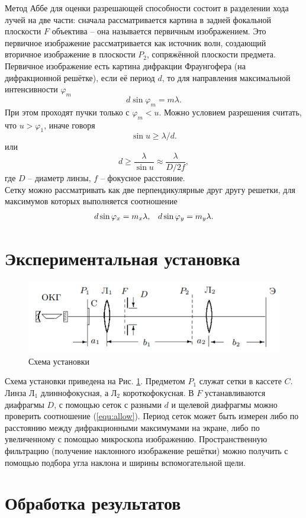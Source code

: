 \documentclass{article}
\begin{document}
Метод Аббе для оценки разрешающей способности состоит в разделении хода лучей на две части: сначала рассматривается картина в задней фокальной плоскости $F$ объектива -- она называется первичным изображением. Это первичное изображение рассматривается как источник волн, создающий вторичное изображение в плоскости $P_2$, сопряжённой плоскости предмета.\\
Первичное изображение есть картина дифракции Фраунгофера (на дифракционной решётке), если её период $d$, то для направления максимальной интенсивности $\varphi_m$
\begin{equation}
d \sin \varphi_m = m\lambda.
\end{equation}
При этом проходят пучки только с $\varphi_m < u$. Можно условием разрешения считать, что $u > \varphi_1$, иначе говоря
$$
\sin u \geq \lambda/d.
$$
или
\begin{equation}
\label{equ:allow}
d \geq \dfrac{\lambda}{\sin u} \approx \dfrac{\lambda}{D/2f},
\end{equation}
где $D$ -- диаметр линзы, $f$ -- фокусное расстояние.\\
Сетку можно рассматривать как две перпендикулярные друг другу решетки, для максимумов которых выполняется соотношение
\begin{equation}
\begin{array}{c c}
d\sin \varphi_x = m_x \lambda, & d\sin \varphi_y = m_y \lambda. \\
\end{array}
\end{equation}

\section{Экспериментальная установка}
\begin{figure}[h]
	\centering
	\includegraphics[scale=0.7]{stand.png}
	\caption{Схема установки}
	\label{fig:stand}
\end{figure}
Схема установки приведена на Рис. \ref{fig:stand}. Предметом $P_1$ служат сетки в кассете $C$. Линза $\text{Л}_1$ длиннофокусная, а $\text{Л}_2$ короткофокусная. В $F$ устанавливаются диафрагмы $D$, с помощью сеток с разными $d$ и щелевой диафрагмы можно проверить соотношение (\ref{equ:allow}). Период сеток может быть измерен либо по расстоянию между дифракционными максимумами на экране, либо по увеличенному с помощью микроскопа изображению. Пространственную фильтрацию (получение наклонного изображение решётки) можно получить с помощью подбора угла наклона и ширины вспомогательной щели.

\section{Обработка результатов}
\end{document}
